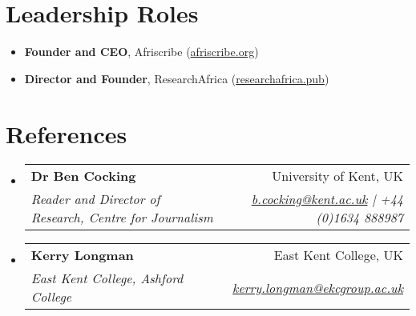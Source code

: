 \documentclass[a4paper,11pt]{article}
\makeatletter
\newcommand{\resumeItem}[1]{
  \item\small{
    {#1 \vspace{-2pt}}
  }
}
\newcommand{\resumeSubheading}[4]{
  \vspace{-2pt}\item
    \begin{tabular*}{0.97\textwidth}[t]{l@{\extracolsep{\fill}}r}
      \textbf{#1} & #2 \\
      \textit{\small#3} & \textit{\small #4} \\
    \end{tabular*}\vspace{-7pt}
}
\newcommand{\resumeSubHeadingListStart}{\begin{itemize}[leftmargin=0.15in, label={}]}
\newcommand{\resumeSubHeadingListEnd}{\end{itemize}}
\newcommand{\resumeItemListStart}{\begin{itemize}}
\newcommand{\resumeItemListEnd}{\end{itemize}\vspace{-5pt}}
\makeatother
\begin{document}
\section{Leadership Roles}
    \resumeItemListStart
        \resumeItem{\textbf{Founder and CEO}, Afriscribe (\href{https://afriscribe.org}{afriscribe.org})}
        \resumeItem{\textbf{Director and Founder}, ResearchAfrica (\href{https://researchafrica.pub}{researchafrica.pub})}
    \resumeItemListEnd

\section{References}
  \resumeSubHeadingListStart
    \resumeSubheading
      {Dr Ben Cocking}{University of Kent, UK}
      {Reader and Director of Research, Centre for Journalism}{\href{mailto:b.cocking@kent.ac.uk}{b.cocking@kent.ac.uk} | +44 (0)1634 888987}

    \resumeSubheading
      {Kerry Longman}{East Kent College, UK}
      {East Kent College, Ashford College}{\href{mailto:kerry.longman@ekcgroup.ac.uk}{kerry.longman@ekcgroup.ac.uk}}
  \resumeSubHeadingListEnd
\end{document}
